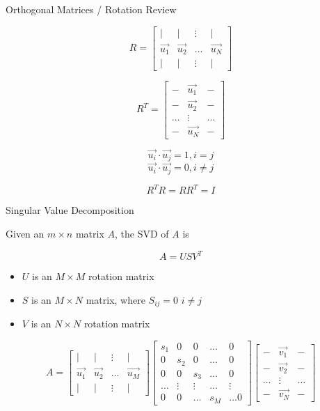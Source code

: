 \documentclass{beamer}
\begin{document}
\begin{frame}{Orthogonal Matrices / Rotation Review}

\[ R = \left[ \begin{array}{cccc} | & | & \vdots & | \\ \vec{u_1} & \vec{u_2} & \hdots & \vec{u_N} \\ | & | & \vdots & | \end{array} \right] \]

\[ R^T = \left[ \begin{array}{ccc} - & \vec{u_1} & - \\ - & \vec{u_2} & - \\ \hdots & \vdots & \hdots \\ - & \vec{u_N} & - \end{array} \right] \]

\[\vec{u_i} \cdot \vec{u_j} = 1, i = j \]
\[\vec{u_i} \cdot \vec{u_j} = 0, i \neq j \]

\[R^TR = RR^T = I \]

\end{frame}

\begin{frame}{Singular Value Decomposition}

Given an $m \times n$ matrix $A$, the SVD of $A$ is

\[ A = U S V^T \]

\begin{itemize}[label=$\vartriangleright$]
\item
$U$ is an $M \times M$ rotation matrix

\item
$S$ is an $M \times N$ matrix, where $S_{ij} = 0$ $i \neq j$

\item
$V$ is an $N \times N$ rotation matrix

\end{itemize}


\[ A =  \left[ \begin{array}{cccc} | & | & \vdots & | \\ \vec{u_1} & \vec{u_2} & \hdots & \vec{u_M} \\ | & | & \vdots & | \end{array} \right]  \left[  \begin{array}{ccccc} s_1 & 0 & 0 & \hdots & 0 \\ 0 & s_2 & 0 & \hdots & 0 \\ 0 & 0 & s_3 & \hdots & 0 \\ \hdots & \vdots & \vdots & \hdots & \vdots \\ 0 & 0 & \hdots & s_M & \hdots 0  \end{array} \right] \left[ \begin{array}{ccc} - & \vec{v_1} & - \\ - & \vec{v_2} & - \\ \hdots & \vdots & \hdots \\ - & \vec{v_N} & - \end{array} \right] \]

\end{frame}
\end{document}
